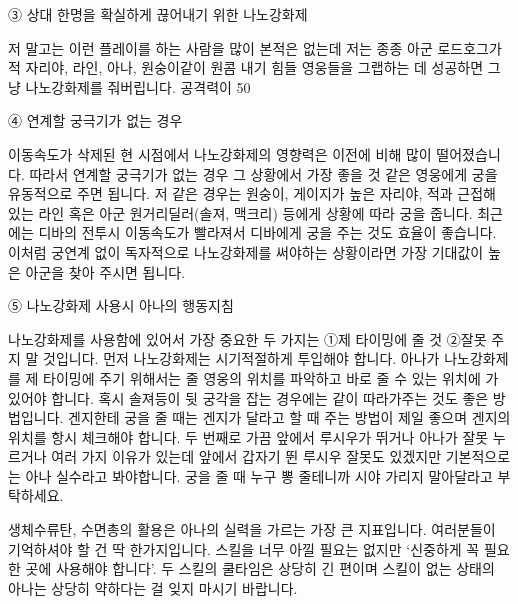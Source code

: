  

③ 상대 한명을 확실하게 끊어내기 위한 나노강화제

저 말고는 이런 플레이를 하는 사람을 많이 본적은 없는데 저는 종종 아군 로드호그가 적 자리야, 라인, 아나, 원숭이같이 원콤 내기 힘들 영웅들을 그랩하는 데 성공하면 그냥 나노강화제를 줘버립니다. 공격력이 50%

 

④ 연계할 궁극기가 없는 경우

이동속도가 삭제된 현 시점에서 나노강화제의 영향력은 이전에 비해 많이 떨어졌습니다. 따라서 연계할 궁극기가 없는 경우 그 상황에서 가장 좋을 것 같은 영웅에게 궁을 유동적으로 주면 됩니다. 저 같은 경우는 원숭이, 게이지가 높은 자리야, 적과 근접해 있는 라인 혹은 아군 원거리딜러(솔져, 맥크리) 등에게 상황에 따라 궁을 줍니다. 최근에는 디바의 전투시 이동속도가 빨라져서 디바에게 궁을 주는 것도 효율이 좋습니다. 이처럼 궁연계 없이 독자적으로 나노강화제를 써야하는 상황이라면 가장 기대값이 높은 아군을 찾아 주시면 됩니다.

 

⑤ 나노강화제 사용시 아나의 행동지침

나노강화제를 사용함에 있어서 가장 중요한 두 가지는 ①제 타이밍에 줄 것 ②잘못 주지 말 것입니다. 먼저 나노강화제는 시기적절하게 투입해야 합니다. 아나가 나노강화제를 제 타이밍에 주기 위해서는 줄 영웅의 위치를 파악하고 바로 줄 수 있는 위치에 가 있어야 합니다. 혹시 솔져등이 뒷 궁각을 잡는 경우에는 같이 따라가주는 것도 좋은 방법입니다. 겐지한테 궁을 줄 때는 겐지가 달라고 할 때 주는 방법이 제일 좋으며 겐지의 위치를 항시 체크해야 합니다. 두 번째로 가끔 앞에서 루시우가 뛰거나 아나가 잘못 누르거나 여러 가지 이유가 있는데 앞에서 갑자기 뛴 루시우 잘못도 있겠지만 기본적으로는 아나 실수라고 봐야합니다. 궁을 줄 때 누구 뽕 줄테니까 시야 가리지 말아달라고 부탁하세요.

 

 

생체수류탄, 수면총의 활용은 아나의 실력을 가르는 가장 큰 지표입니다. 여러분들이 기억하셔야 할 건 딱 한가지입니다. 스킬을 너무 아낄 필요는 없지만 ‘신중하게 꼭 필요한 곳에 사용해야 합니다’. 두 스킬의 쿨타임은 상당히 긴 편이며 스킬이 없는 상태의 아나는 상당히 약하다는 걸 잊지 마시기 바랍니다.

